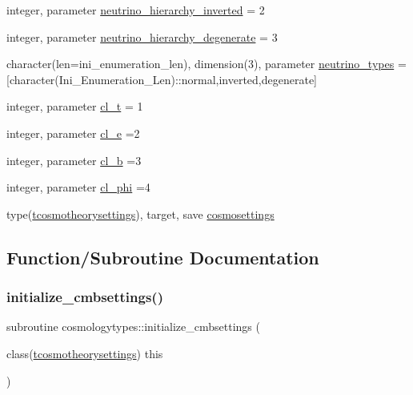 \begin{DoxyCompactItemize}
\item 
integer, parameter \mbox{\hyperlink{namespacecosmologytypes_a61a310ab75549fa17f2c5dbd9ec7e638}{neutrino\+\_\+hierarchy\+\_\+inverted}} = 2
\item 
integer, parameter \mbox{\hyperlink{namespacecosmologytypes_add030eb1dcdea0a5221e749a63870ee2}{neutrino\+\_\+hierarchy\+\_\+degenerate}} = 3
\item 
character(len=ini\+\_\+enumeration\+\_\+len), dimension(3), parameter \mbox{\hyperlink{namespacecosmologytypes_a6c895faee0146a00099a99e8caa7b0b1}{neutrino\+\_\+types}} = \mbox{[}character(Ini\+\_\+\+Enumeration\+\_\+\+Len)\+::\textquotesingle{}normal\textquotesingle{},\textquotesingle{}inverted\textquotesingle{},\textquotesingle{}degenerate\textquotesingle{}\mbox{]}
\item 
integer, parameter \mbox{\hyperlink{namespacecosmologytypes_abddefae1172ac2704cb3a3b22704aaa1}{cl\+\_\+t}} = 1
\item 
integer, parameter \mbox{\hyperlink{namespacecosmologytypes_aded7f72c34bf738967d5fb32e4edc1e3}{cl\+\_\+e}} =2
\item 
integer, parameter \mbox{\hyperlink{namespacecosmologytypes_a59dfbed9693b76beb42a0c48ec80b388}{cl\+\_\+b}} =3
\item 
integer, parameter \mbox{\hyperlink{namespacecosmologytypes_a25e618d45dab8f1c5092d92e772f81d0}{cl\+\_\+phi}} =4
\item 
type(\mbox{\hyperlink{structcosmologytypes_1_1tcosmotheorysettings}{tcosmotheorysettings}}), target, save \mbox{\hyperlink{namespacecosmologytypes_a6456ff7e508a263c46d00481a14d3389}{cosmosettings}}
\end{DoxyCompactItemize}


\subsection{Function/\+Subroutine Documentation}
\mbox{\label{namespacecosmologytypes_a6ff2631493b535981c446bede67a936f}} 
\subsubsection{\texorpdfstring{initialize\+\_\+cmbsettings()}{initialize\_cmbsettings()}}
{\footnotesize\ttfamily subroutine cosmologytypes\+::initialize\+\_\+cmbsettings (\begin{DoxyParamCaption}\item[{class(\mbox{\hyperlink{structcosmologytypes_1_1tcosmotheorysettings}{tcosmotheorysettings}})}]{this }\end{DoxyParamCaption})}



